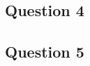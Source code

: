 \documentclass[a4paper,11pt]{article}
\begin{document}
\subsection{Question 4}

\subsection{Question 5}

\clearpage


%
%




\end{document}
